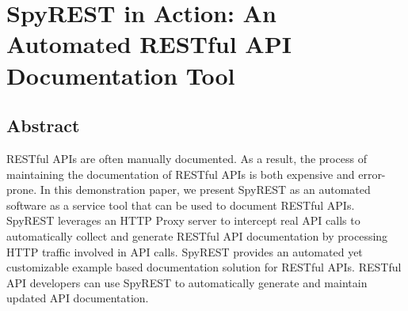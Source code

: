 


\chapter{SpyREST in Action: An Automated RESTful API Documentation Tool}
\label{chapter:demo_paper}



\section{Abstract}
RESTful APIs are often manually documented. As a result, the process of maintaining the documentation of RESTful APIs is both expensive and error-prone. In this demonstration paper, we present SpyREST as an automated software as a service tool that can be used to document RESTful APIs. SpyREST leverages an HTTP Proxy server to intercept real API calls to automatically collect and generate RESTful API documentation by processing HTTP traffic involved in API calls. SpyREST provides an automated yet customizable example based documentation solution for RESTful APIs. RESTful API developers can use SpyREST to automatically generate and maintain updated API documentation.




